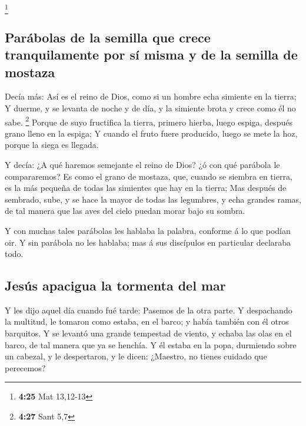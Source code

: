 \footnote{\textbf{4:25} Mat 13,12-13}

\hypertarget{paruxe1bolas-de-la-semilla-que-crece-tranquilamente-por-suxed-misma-y-de-la-semilla-de-mostaza}{%
\subsection{Parábolas de la semilla que crece tranquilamente por sí
misma y de la semilla de
mostaza}\label{paruxe1bolas-de-la-semilla-que-crece-tranquilamente-por-suxed-misma-y-de-la-semilla-de-mostaza}}

 Decía más: Así es el reino de Dios, como si un hombre
echa simiente en la tierra;  Y duerme, y se levanta de
noche y de día, y la simiente brota y crece como él no sabe. \footnote{\textbf{4:27}
  Sant 5,7}  Porque de suyo fructifica la tierra, primero
hierba, luego espiga, después grano lleno en la espiga; 
Y cuando el fruto fuere producido, luego se mete la hoz, porque la siega
es llegada.

 Y decía: ¿A qué haremos semejante el reino de Dios? ¿ó
con qué parábola le compararemos?  Es como el grano de
mostaza, que, cuando se siembra en tierra, es la más pequeña de todas
las simientes que hay en la tierra;  Mas después de
sembrado, sube, y se hace la mayor de todas las legumbres, y echa
grandes ramas, de tal manera que las aves del cielo puedan morar bajo su
sombra.

 Y con muchas tales parábolas les hablaba la palabra,
conforme á lo que podían oir.  Y sin parábola no les
hablaba; mas á sus discípulos en particular declaraba todo.

\hypertarget{jesuxfas-apacigua-la-tormenta-del-mar}{%
\subsection{Jesús apacigua la tormenta del
mar}\label{jesuxfas-apacigua-la-tormenta-del-mar}}

 Y les dijo aquel día cuando fué tarde: Pasemos de la
otra parte.  Y despachando la multitud, le tomaron como
estaba, en el barco; y había también con él otros barquitos.
 Y se levantó una grande tempestad de viento, y echaba
las olas en el barco, de tal manera que ya se henchía.  Y
él estaba en la popa, durmiendo sobre un cabezal, y le despertaron, y le
dicen: ¿Maestro, no tienes cuidado que perecemos?

